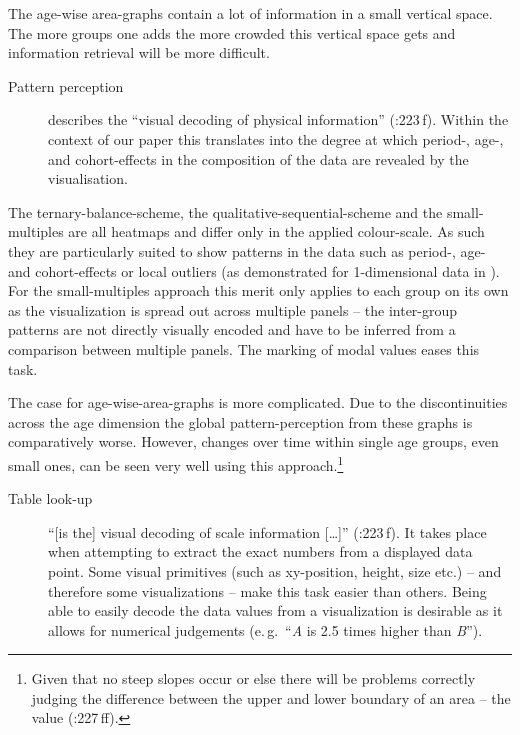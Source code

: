 \documentclass[a4paper, 12pt]{scrartcl}
\begin{document}
The age-wise area-graphs contain a lot of information in a small vertical space. The more groups one adds the more crowded this vertical space gets and information retrieval will be more difficult.

\begin{description}
  \item[Pattern perception] describes the \enquote{visual decoding of physical information} (\cite{Cleveland1994}:223\,f). Within the context of our paper this translates into the degree at which  period-, age-, and cohort-effects in the composition of the data are revealed by the visualisation.
\end{description}

The ternary-balance-scheme, the qualitative-sequential-scheme and the small-multiples are all heatmaps and differ only in the applied colour-scale. As such they are particularly suited to show patterns in the data such as period-, age- and cohort-effects or local outliers (as demonstrated for 1-dimensional data in \cite{Vaupel1987}). For the small-multiples approach this merit only applies to each group on its own as the visualization is spread out across multiple panels -- the inter-group patterns are not directly visually encoded and have to be inferred from a comparison between multiple panels. The marking of modal values eases this task.

The case for age-wise-area-graphs is more complicated. Due to the discontinuities across the age dimension the global pattern-perception from these graphs is comparatively worse. However, changes over time within single age groups, even small ones, can be seen very well using this approach.\footnote{Given that no steep slopes occur or else there will be problems correctly judging the difference between the upper and lower boundary of an area -- the value (\cite{Cleveland1994}:227\,ff).}

\begin{description}
  \item[Table look-up] \enquote{[is the] visual decoding of scale information [\ldots]} (\cite{Cleveland1994}:223\,f). It takes place when attempting to extract the exact numbers from a displayed data point. Some visual primitives (such as xy-position, height, size etc.) -- and therefore some visualizations -- make this task easier than others. Being able to easily decode the data values from a visualization is desirable as it allows for numerical judgements (e.\,g.~\enquote{\emph{A} is 2.5 times higher than \emph{B}}).
\end{description}
\end{document}
